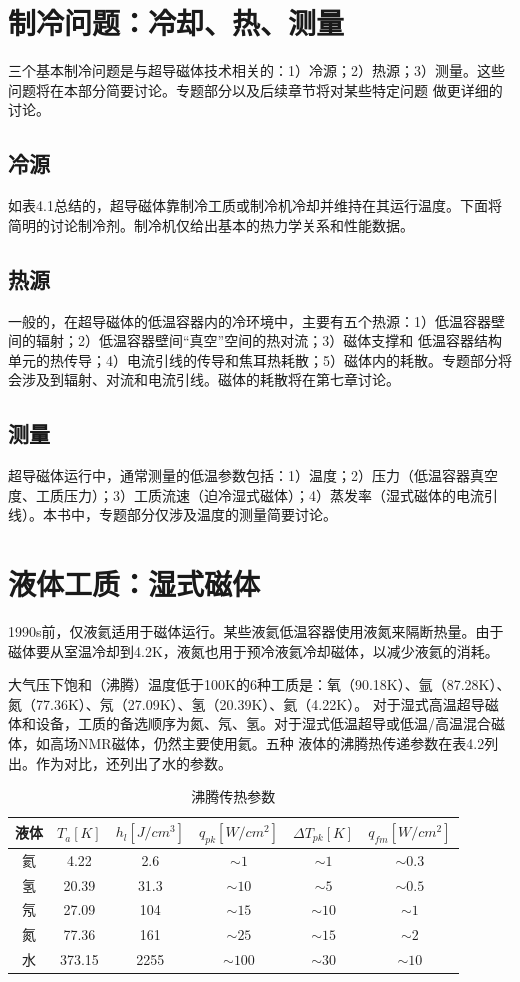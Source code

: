 \section{制冷问题：冷却、热、测量}
三个基本制冷问题是与超导磁体技术相关的：1）冷源；2）热源；3）测量。这些问题将在本部分简要讨论。专题部分以及后续章节将对某些特定问题
做更详细的讨论。
\subsection{冷源}
如表4.1总结的，超导磁体靠制冷工质或制冷机冷却并维持在其运行温度。下面将简明的讨论制冷剂。制冷机仅给出基本的热力学关系和性能数据。
\subsection{热源}
一般的，在超导磁体的低温容器内的冷环境中，主要有五个热源：1）低温容器壁间的辐射；2）低温容器壁间“真空”空间的热对流；3）磁体支撑和
低温容器结构单元的热传导；4）电流引线的传导和焦耳热耗散；5）磁体内的耗散。专题部分将会涉及到辐射、对流和电流引线。磁体的耗散将在第七章讨论。
\subsection{测量}
超导磁体运行中，通常测量的低温参数包括：1）温度；2）压力（低温容器真空度、工质压力）；3）工质流速（迫冷湿式磁体）；4）蒸发率（湿式磁体的电流引线）。本书中，专题部分仅涉及温度的测量简要讨论。

\section{液体工质：湿式磁体}
1990s前，仅液氦适用于磁体运行。某些液氦低温容器使用液氮来隔断热量。由于磁体要从室温冷却到4.2K，液氮也用于预冷液氦冷却磁体，以减少液氦的消耗。

大气压下饱和（沸腾）温度低于100K的6种工质是：氧（90.18K）、氩（87.28K）、氮（77.36K）、氖（27.09K）、氢（20.39K）、氦（4.22K）。
对于湿式高温超导磁体和设备，工质的备选顺序为氮、氖、氢。对于湿式低温超导或低温/高温混合磁体，如高场NMR磁体，仍然主要使用氦。五种
液体的沸腾热传递参数在表4.2列出。作为对比，还列出了水的参数。

\begin{table}[htbp]\small
  \centering
  \caption{沸腾传热参数} \label{boilingpara}
\begin{tabular}{|c||c|c|c|c|c|}
  \hline
\textbf{液体}&$T_a[K]$&$h_l[J/cm^3]$&$q_{pk}[W/cm^2]$&$\Delta T_{pk}[K]$&$q_{fm}[W/cm^2]$ \\ \hline \hline
氦&4.22&2.6&$\sim 1$&$\sim 1$&$\sim 0.3$\\ \hline
氢&20.39&31.3&$\sim 10$&$\sim 5$&$\sim 0.5$ \\ \hline
氖&27.09&104&$\sim 15$&$\sim 10$&$\sim 1$\\ \hline
氮&77.36&161&$\sim 25$&$\sim 15$&$\sim 2$\\ \hline
水&373.15&2255&$\sim 100$&$\sim 30$&$\sim 10$ \\ \hline
\end{tabular}
\end{table}

